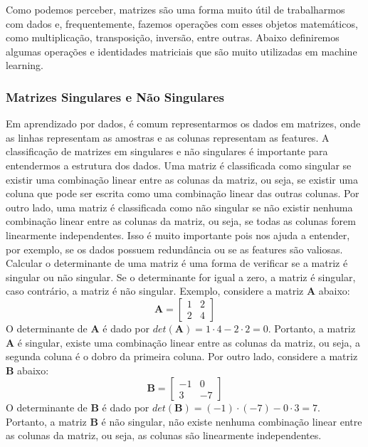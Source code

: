 Como podemos perceber, matrizes são uma forma muito útil de trabalharmos com dados e, frequentemente, fazemos operações com esses objetos matemáticos, como multiplicação, transposição, inversão, entre outras. Abaixo definiremos algumas operações e identidades matriciais que são muito utilizadas em machine learning.

\subsubsection{Matrizes Singulares e Não Singulares}

Em aprendizado por dados, é comum representarmos os dados em matrizes, onde as linhas representam as amostras e as colunas representam as features. A classificação de matrizes em singulares e não singulares é importante para entendermos a estrutura dos dados. Uma matriz é classificada como singular se existir uma combinação linear entre as colunas da matriz, ou seja, se existir uma coluna que pode ser escrita como uma combinação linear das outras colunas. Por outro lado, uma matriz é classificada como não singular se não existir nenhuma combinação linear entre as colunas da matriz, ou seja, se todas as colunas forem linearmente independentes. Isso é muito importante pois nos ajuda a entender, por exemplo, se os dados possuem redundância ou se as features são valiosas. Calcular o determinante de uma matriz é uma forma de verificar se a matriz é singular ou não singular. Se o determinante for igual a zero, a matriz é singular, caso contrário, a matriz é não singular. Exemplo, considere a matriz $\mathbf{A}$ abaixo:
\[
    \mathbf{A} = 
    \begin{bmatrix}     
        1 & 2 \\
        2 & 4   
    \end{bmatrix}
\]
O determinante de $\mathbf{A}$ é dado por $det(\mathbf{A}) = 1 \cdot 4 - 2 \cdot 2 = 0$. Portanto, a matriz $\mathbf{A}$ é singular, existe uma combinação linear entre as colunas da matriz, ou seja, a segunda coluna é o dobro da primeira coluna. Por outro lado, considere a matriz $\mathbf{B}$ abaixo:
\[
    \mathbf{B} = 
    \begin{bmatrix}     
        -1 & 0 \\
        3 & -7
    \end{bmatrix}
\]
O determinante de $\mathbf{B}$ é dado por $det(\mathbf{B}) = (-1) \cdot (-7) - 0 \cdot 3 = 7$. Portanto, a matriz $\mathbf{B}$ é não singular, não existe nenhuma combinação linear entre as colunas da matriz, ou seja, as colunas são linearmente independentes.



